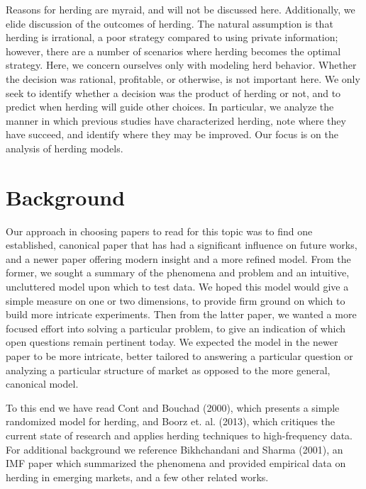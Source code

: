\documentclass{article}
\begin{document}
Reasons for herding are myraid, and will not be discussed here.
Additionally, we elide discussion of the outcomes of herding.
The natural assumption is that herding is irrational, a poor strategy compared to using private information; however, there are a number of scenarios where herding becomes the optimal strategy.
Here, we concern ourselves only with modeling herd behavior.
Whether the decision was rational, profitable, or otherwise, is not important here.
We only seek to identify whether a decision was the product of herding or not, and to predict when herding will guide other choices.
In particular, we analyze the manner in which previous studies have characterized herding, note where they have succeed, and identify where they may be improved.
Our focus is on the analysis of herding models.

\section{Background}
Our approach in choosing papers to read for this topic was to find one established, canonical paper that has had a significant influence on future works, and a newer paper offering modern insight and a more refined model.
From the former, we sought a summary of the phenomena and problem and an intuitive, uncluttered model upon which to test data.
We hoped this model would give a simple measure on one or two dimensions, to provide firm ground on which to build more intricate experiments.
Then from the latter paper, we wanted a more focused effort into solving a particular problem, to give an indication of which open questions remain pertinent today.
We expected the model in the newer paper to be more intricate, better tailored to answering a particular question or analyzing a particular structure of market as opposed to the more general, canonical model.

To this end we have read Cont and Bouchad (2000), which presents a simple randomized model for herding, and Boorz et. al. (2013), which critiques the current state of research and applies herding techniques to high-frequency data.
For additional background we reference Bikhchandani and Sharma (2001), an IMF paper which summarized the phenomena and provided empirical data on herding in emerging markets, and a few other related works.
\end{document}
